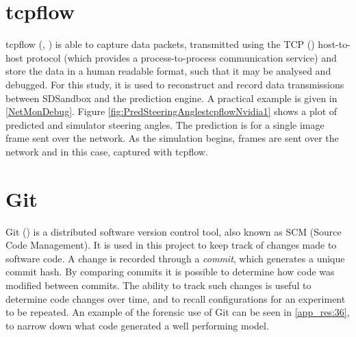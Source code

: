 \section{tcpflow}
tcpflow (\cite{tcpflowElson2013}, \cite{garfinkel2013passive}) is able to capture data packets, transmitted using the TCP (\cite{rfc793}) host-to-host protocol (which provides a process-to-process communication service) and store the data in a human readable format, such that it may be analysed and debugged. For this study, it is used to reconstruct and record data transmissions between SDSandbox and the prediction engine. A practical example is given in \ref{NetMonDebug}.
Figure \ref{fig:PredSteeringAnglestcpflowNvidia1} shows a plot of predicted and simulator steering angles. The prediction is for a single image frame sent over the network. As the simulation begins, frames are sent over the network and in this case, captured with tcpflow.

\section{Git}
Git (\cite{chacon2014pro}) is a distributed software version control tool, also known as SCM (Source Code Management). It is used in this project to keep track of changes made to software code. A change is recorded through a \textit{commit}, which generates a unique commit hash. By comparing commits it is possible to determine how code was modified between commits. The ability to track such changes is useful to determine code changes over time, and to recall configurations for an experiment to be repeated. An example of the forensic use of Git can be seen in \ref{app_res:36}, to narrow down what code generated a well performing model.


